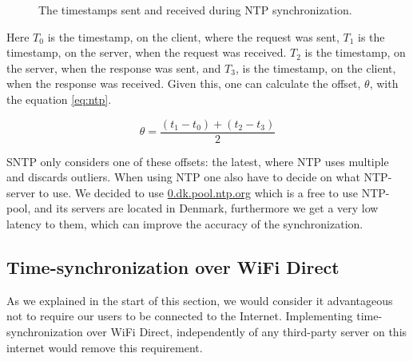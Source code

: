 \begin{figure}[htb]
    \centering
    \caption{The timestamps sent and received during \ac{NTP} synchronization.}
    \label{fig:ntp_packets}
\end{figure}

Here $T_0$ is the timestamp, on the client, where the request was sent, $T_1$ is the timestamp, on the server, when the request was received.
$T_2$ is the timestamp, on the server, when the response was sent, and $T_3$, is the timestamp, on the client, when the response was received.
Given this, one can calculate the offset, $\theta$, with the equation \ref{eq:ntp}.

\begin{equation}\label{eq:ntp}
    \theta = \frac{(t_1 - t_0)+(t_2 - t_3)}{2}
\end{equation}

\ac{SNTP} only considers one of these offsets: the latest, where \ac{NTP} uses multiple and discards outliers.
When using \ac{NTP} one also have to decide on what \ac{NTP}-server to use.
We decided to use \url{0.dk.pool.ntp.org} which is a free to use \ac{NTP}-pool, and its servers are located in Denmark, furthermore we get a very low latency to them, which can improve the accuracy of the synchronization.

\subsection{Time-synchronization over WiFi Direct}
As we explained in the start of this section, we would consider it advantageous not to require our users to be connected to the Internet.
Implementing time-synchronization over WiFi Direct, independently of any third-party server on this internet would remove this requirement.

